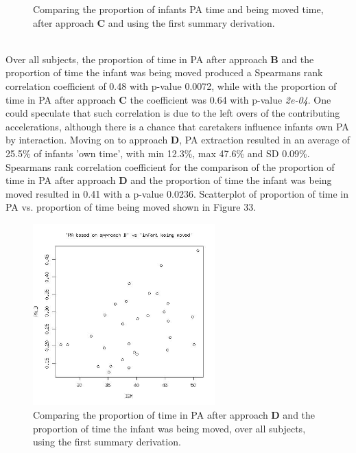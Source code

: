 \documentclass{article}
\begin{document}
{\begin{figure}[h]
\caption{Comparing the proportion of infants PA time and being moved time, after approach \textbf{C} and using the first summary derivation.}
\end{figure}
\\
Over all subjects, the proportion of time in PA after approach \textbf{B} and the proportion of time the infant was being moved produced a Spearmans rank correlation coefficient of 0.48 with p-value 0.0072, while with the proportion of time in PA after approach \textbf{C} the coefficient was 0.64 with p-value \textit{2e-04}. One could speculate that such correlation is due to the left overs of the contributing accelerations, although there is a chance that caretakers influence infants own PA by interaction.
Moving on to approach \textbf{D}, PA extraction resulted in an average of 25.5\% of infants 'own time', with min 12.3\%, max 47.6\% and SD 0.09\%. Spearmans rank correlation coefficient for the comparison of the proportion of time in PA after approach \textbf{D} and the proportion of time the infant was being moved resulted in 0.41 with a p-value 0.0236. Scatterplot of proportion of time in PA vs. proportion of time being moved shown in Figure 33.\\
\begin{figure}[h]
\includegraphics[width=7cm, height=7cm]{scatterplotPADIBM.jpg}
\caption{Comparing the proportion of time in PA after approach \textbf{D} and the proportion of time the infant was being moved, over all subjects, using the first summary derivation.}
\end{figure}

}
\end{document}
